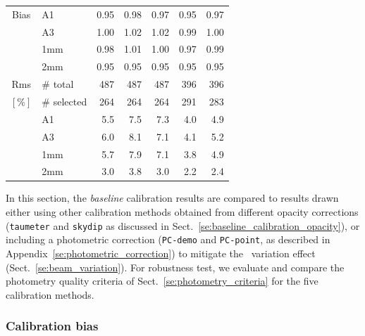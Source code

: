 \begin{table}[!htbp]
\begin{center}
\begin{tabular}{clrrrrr}
  Bias &  A1            &   0.95   &  0.98    &  0.97    &   0.95    &  0.97  \\
       &  A3            &   1.00   &  1.02    &  1.02    &   0.99    &  1.00  \\
       &  1mm           &   0.98   &  1.01    &  1.00    &   0.97    &  0.99  \\
       &  2mm           &   0.95   &  0.95    &  0.95    &   0.95    &  0.95  \\
  \hline
  \noalign{\smallskip}
  Rms  &  $\#$ total      &   487    &    487   &    487    &    396    &  396 \\
  $[\%]$ &  $\#$ selected &   264    &    264   &    264    &    291    &  283 \\
       &  A1            &   5.5    &    7.5   &    7.3    &    4.0    &  4.9 \\
       &  A3            &   6.0    &    8.1   &    7.1    &    4.1    &  5.2 \\
       &  1mm           &   5.7    &    7.9   &    7.1    &    3.8    &  4.9 \\
       &  2mm           &   3.0    &    3.8   &    3.0    &    2.2    &  2.4 \\
\hline
\end{tabular}
\end{center}
\end{table}

In this section, the \emph{baseline} calibration results are compared to
results drawn either using other calibration methods obtained from different
opacity corrections ({\tt taumeter} and {\tt skydip} as
discussed in Sect.~\ref{se:baseline_calibration_opacity}), or
including a photometric correction ({\tt PC-demo} and {\tt PC-point},
as described in Appendix~\ref{se:photometric_correction}) to mitigate
the \afternoon\ variation effect (Sect.~\ref{se:beam_variation}).
For robustness test, we evaluate and compare the photometry quality criteria of
Sect.~\ref{se:photometry_criteria} for the five calibration methods.


\subsubsection{Calibration bias}
\label{se:calibration_bias_all}

